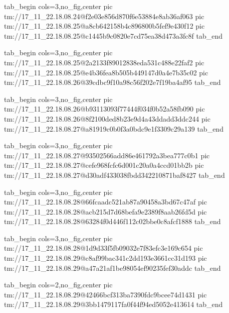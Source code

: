  
 
 
 
 

\qqSecCmtScr


\ifcmt
  tab_begin cols=3,no_fig,center
    pic tm://17_11_22.18.08.24@f2e03e856d870f6e53884e8ab36af063
    pic tm://17_11_22.18.08.25@a8cb642158b4c896800b5fef9e430f12
    pic tm://17_11_22.18.08.25@c1445b9c0820e7cd75ea38d473a3fc8f
  tab_end
\fi


\ifcmt
  tab_begin cols=3,no_fig,center
    pic tm://17_11_22.18.08.25@2a2133f89012838eda531c488e22faf2
    pic tm://17_11_22.18.08.25@e4b36fea8b505b449147d0a4e7b35c02
    pic tm://17_11_22.18.08.26@39cdbc9f10a98c56f202e7f19ba4af95
  tab_end
\fi


\ifcmt
  tab_begin cols=3,no_fig,center
    pic tm://17_11_22.18.08.26@b93113093f77444f034f0b52a58fb090
    pic tm://17_11_22.18.08.26@8f2100ded8b23e9d4a43ddadd3ddc244
    pic tm://17_11_22.18.08.27@a81919c0b0f3a0bdc9e1f3309c29a139
  tab_end
\fi


\ifcmt
  tab_begin cols=3,no_fig,center
    pic tm://17_11_22.18.08.27@93502566add86e461792a3bea777c0b1
    pic tm://17_11_22.18.08.27@cefe968fcfc6d001c20a0a4ccd01bb2b
    pic tm://17_11_22.18.08.27@d30adf433038fbdd342210871baf8427
  tab_end
\fi


\ifcmt
  tab_begin cols=3,no_fig,center
    pic tm://17_11_22.18.08.28@66fcaadc521ab87a90458a3bd67c47af
    pic tm://17_11_22.18.08.28@acb215d7d68befa9e2389f8aab26fd5d
    pic tm://17_11_22.18.08.28@63284f0d446f112c02bbe0c8afcf1888
  tab_end
\fi


\ifcmt
  tab_begin cols=3,no_fig,center
    pic tm://17_11_22.18.08.28@1d9d33f5fb09032e7f83efc3e169c654
    pic tm://17_11_22.18.08.29@c8af99bac341c2dd193e3661cc31d193
    pic tm://17_11_22.18.08.29@a47a21af1be98054ef90235fef30addc
  tab_end
\fi


\ifcmt
  tab_begin cols=2,no_fig,center
    pic tm://17_11_22.18.08.29@42466bcf313ba7390fdc9bcee74d1431
    pic tm://17_11_22.18.08.29@3bb1479117fa0f44f94ed5052e413614
  tab_end
\fi


